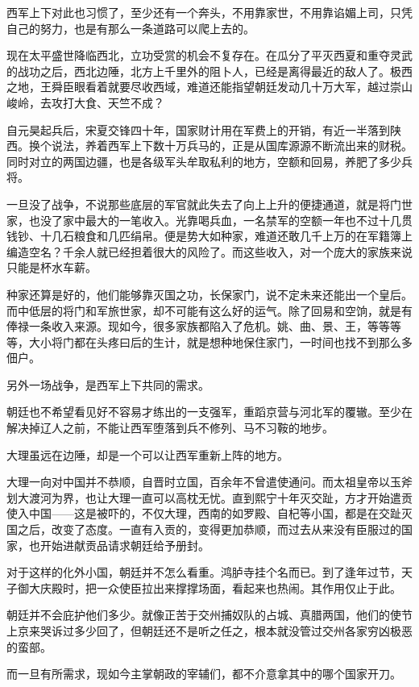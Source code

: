 西军上下对此也习惯了，至少还有一个奔头，不用靠家世，不用靠谄媚上司，只凭自己的努力，也是有那么一条道路可以爬上去的。

现在太平盛世降临西北，立功受赏的机会不复存在。在瓜分了平灭西夏和重夺灵武的战功之后，西北边陲，北方上千里外的阻卜人，已经是离得最近的敌人了。极西之地，王舜臣眼看着就要尽收西域，难道还能指望朝廷发动几十万大军，越过崇山峻岭，去攻打大食、天竺不成？

自元昊起兵后，宋夏交锋四十年，国家财计用在军费上的开销，有近一半落到陕西。换个说法，养着西军上下数十万兵马的，正是从国库源源不断流出来的财税。同时对立的两国边疆，也是各级军头牟取私利的地方，空额和回易，养肥了多少兵将。

一旦没了战争，不说那些底层的军官就此失去了向上上升的便捷通道，就是将门世家，也没了家中最大的一笔收入。光靠喝兵血，一名禁军的空额一年也不过十几贯钱钞、十几石粮食和几匹绢帛。便是势大如种家，难道还敢几千上万的在军籍簿上编造空名？千余人就已经担着很大的风险了。而这些收入，对一个庞大的家族来说只能是杯水车薪。

种家还算是好的，他们能够靠灭国之功，长保家门，说不定未来还能出一个皇后。而中低层的将门和军旅世家，却不可能有这么好的运气。除了回易和空饷，就是有俸禄一条收入来源。现如今，很多家族都陷入了危机。姚、曲、景、王，等等等等，大小将门都在头疼曰后的生计，就是想种地保住家门，一时间也找不到那么多佃户。

另外一场战争，是西军上下共同的需求。

朝廷也不希望看见好不容易才练出的一支强军，重蹈京营与河北军的覆辙。至少在解决掉辽人之前，不能让西军堕落到兵不修列、马不习鞍的地步。

大理虽远在边陲，却是一个可以让西军重新上阵的地方。

大理一向对中国并不恭顺，自晋时立国，百余年不曾遣使通问。而太祖皇帝以玉斧划大渡河为界，也让大理一直可以高枕无忧。直到熙宁十年灭交趾，方才开始遣贡使入中国——这是被吓的，不仅大理，西南的如罗殿、自杞等小国，都是在交趾灭国之后，改变了态度。一直有入贡的，变得更加恭顺，而过去从来没有臣服过的国家，也开始进献贡品请求朝廷给予册封。

对于这样的化外小国，朝廷并不怎么看重。鸿胪寺挂个名而已。到了逢年过节，天子御大庆殿时，把一众使臣拉出来撑撑场面，看起来也热闹。其作用仅止于此。

朝廷并不会庇护他们多少。就像正苦于交州捕奴队的占城、真腊两国，他们的使节上京来哭诉过多少回了，但朝廷还不是听之任之，根本就没管过交州各家穷凶极恶的蛮部。

而一旦有所需求，现如今主掌朝政的宰辅们，都不介意拿其中的哪个国家开刀。

